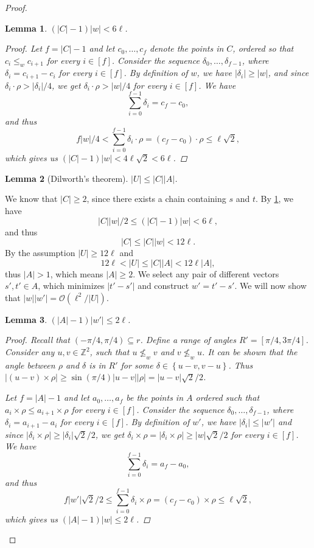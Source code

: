 \documentclass[11pt, letterpaper]{article}
\theoremstyle{plain}
\newtheorem{lemma}{Lemma}
\theoremstyle{definition}
\theoremstyle{remark}
\newcommand{\Z}{\mathbb{Z}}
\renewcommand{\O}{\mathcal{O}}
\newcommand{\set}[1]{\left\lbrace #1 \right\rbrace}
\begin{document}
\begin{proof}
\begin{lemma}\label{C_ineq}
	$(|C| - 1) |w| < 6\ell$. 
	\begin{proof}
		Let $f = |C| - 1$ and
		let $c_0, \dots, c_{f}$ denote the points in $C$, ordered so that $c_i \le_w c_{i + 1}$ for every $i \in [f]$.
		Consider the sequence $\delta_0, \dots, \delta_{f - 1}$, where $\delta_i = c_{i + 1} - c_i$ for every $i \in [f]$.
		By definition of $w$, we have $|\delta_i| \ge |w|$,
		and since $\delta_i \cdot \rho > |\delta_i| / 4$, we get
		$\delta_i \cdot \rho > |w| / 4$ for every $i \in [f]$.
		We have
		\[ \sum_{i = 0}^{f - 1} \delta_i = c_f - c_0,\]
		and thus
		\[ f|w| / 4 < \sum_{i = 0}^{f - 1} \delta_i \cdot \rho = (c_f - c_0) \cdot \rho \le \ell \sqrt{2}, \]
		which gives us $(|C| - 1)|w| < 4\ell \sqrt{2} < 6\ell$.
	\end{proof}
\end{lemma}

\begin{lemma}[Dilworth's theorem]\label{dilworth}
	$|U| \le |C| |A|$.
\end{lemma}

We know that $|C| \ge 2$, since there exists a chain containing $s$ and $t$.
By \cref{C_ineq}, we have
\[ |C||w| / 2 \le (|C| - 1)|w| < 6\ell, \]
and thus
\[ |C| \le |C||w| < 12\ell. \]
By the assumption $|U| \ge 12\ell$ and 
\[12 \ell < |U| \le |C| |A| < 12\ell|A|,\]
thus $|A| > 1$, which means $|A| \ge 2$.
We select any pair of different vectors $s', t' \in A$, which minimizes $|t' - s'|$ and construct $w' = t' - s'$.
We will now show that $|w||w'| = \O(\ell^2 / |U|)$.

\begin{lemma}\label{A_ineq}
	$(|A| - 1) |w'| \le 2\ell$. 
	\begin{proof}
		Recall that $(-\pi / 4, \pi / 4) \subseteq r$.
		Define a range of angles $R' = [\pi / 4, 3\pi / 4]$.
		Consider any $u, v \in \Z^2$, such that $u \not \le_w v$ and $v \not \le_w u$.
		It can be shown that the angle between $\rho$ and $\delta$ is in $R'$ for some $\delta \in \set{u - v, v - u}$.
		Thus $|(u - v) \times \rho| \ge \sin(\pi / 4) |u - v||\rho| = |u - v|\sqrt{2} / 2$.
		
		Let $f = |A| - 1$ and let $a_0, \dots, a_{f}$ be the points in $A$ ordered such that $a_i \times \rho \le a_{i + 1} \times \rho$ for every $i \in [f]$.
		Consider the sequence $\delta_0, \dots, \delta_{f - 1}$, where $\delta_i = a_{i + 1} - a_i$ for every $i \in [f]$.
		By definition of $w'$, we have $|\delta_i| \le |w'|$ and since $|\delta_i \times \rho| \ge |\delta_i|\sqrt{2} / 2$, we get $\delta_i \times \rho = |\delta_i \times \rho| \ge |w| \sqrt{2} / 2$ for every $i \in [f]$.
		We have
		\[ \sum_{i = 0}^{f - 1} \delta_i = a_f - a_0,\]
		and thus
		\[ f|w'| \sqrt{2}/2 \le \sum_{i = 0}^{f - 1} \delta_i \times \rho = (c_f - c_0) \times \rho \le \ell \sqrt{2}, \]
		which gives us $(|A| - 1)|w| \le 2\ell$.
	\end{proof}
\end{lemma}


\end{proof}
\end{document}
